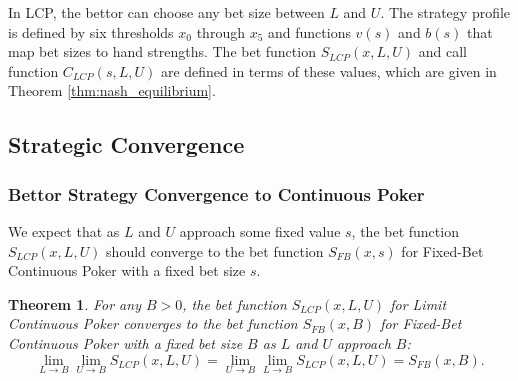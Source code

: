 \documentclass[a4paper,12pt]{article}
\theoremstyle{plain}
\newtheorem{theorem}{Theorem}[section]
\theoremstyle{definition}
\begin{document}
In LCP, the bettor can choose any bet size between $L$ and $U$. The strategy profile is defined by six thresholds $x_0$ through $x_5$ and functions $v(s)$ and $b(s)$ that map bet sizes to hand strengths. The bet function $S_{LCP}(x, L, U)$ and call function $C_{LCP}(s, L, U)$ are defined in terms of these values, which are given in Theorem \ref{thm:nash_equilibrium}.

\subsection{Strategic Convergence}
\label{sec:strategic_convergence}

\subsubsection{Bettor Strategy Convergence to Continuous Poker}
We expect that as $L$ and $U$ approach some fixed value $s$, the bet function $S_{LCP}(x, L, U)$ should converge to the bet function $S_{FB}(x, s)$ for Fixed-Bet Continuous Poker with a fixed bet size $s$. 

\begin{theorem}
	 For any $B > 0$, the bet function $S_{LCP}(x, L, U)$ for Limit Continuous Poker converges to the bet function $S_{FB}(x, B)$ for Fixed-Bet Continuous Poker with a fixed bet size $B$ as $L$ and $U$ approach $B$:
\[
\lim_{L \to B} \lim_{U \to B} S_{LCP}(x, L, U) = \lim_{U \to B} \lim_{L \to B} S_{LCP}(x, L, U) = S_{FB}(x, B).
\]
\end{theorem}
\end{document}
